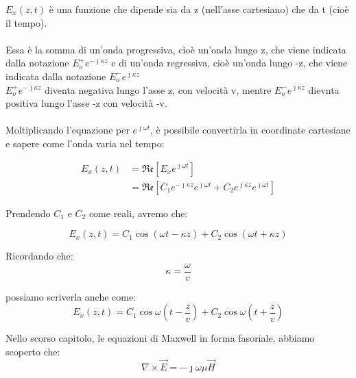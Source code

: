 $E_x (z,t)$ è una funzione che dipende sia da z (nell'asse cartesiano) che da t (cioè il tempo).  \\ \\

Essa è la somma di un'onda progressiva, cioè un'onda lungo z, che viene indicata dalla notazione $E_o ^+ e^{-\jmath \kappa z}$ 
e di un'onda regressiva, cioè un'onda lungo -z, che viene indicata dalla notazione $E_o ^- e^{\jmath \kappa z}$ \\ 

$E_o ^+ e^{-\jmath \kappa z}$ diventa negativa lungo l'asse z, con velocità v, mentre $E_o ^- e^{\jmath \kappa z}$ dievnta positiva 
lungo l'asse -z con velocità -v. \\ \\ 

Moltiplicando l'equazione per $e^{\jmath \omega t}$, è possibile convertirla in coordinate cartesiane e sapere come l'onda varia nel tempo:

{
    \Large
    \begin{equation}
        \begin{split}
            E_x (z,t) 
            &= \mathfrak{Re}[E_x e^{\jmath \omega t}]\\ 
            &= \mathfrak{Re}[C_1 e^{- \jmath \kappa z} e^{\jmath \omega t} +  C_2 e^{ \jmath \kappa z} e^{\jmath \omega t}]            
        \end{split}
    \end{equation}
}


Prendendo $C_1$ e $C_2$ come reali, avremo che: 

{
    \Large
    \begin{equation}
    E_x (z,t) = C_1 \cos(\omega t - \kappa z) + C_2 \cos(\omega t + \kappa z)    
    \end{equation}
}

Ricordando che: 
{
    \Large
    \begin{equation}
        \kappa = \frac{\omega}{v}   
    \end{equation}
}

possiamo scriverla anche come: 
{
    \Large 
    \begin{equation}
    E_x (z,t) = C_1 \cos\omega( t - \frac{z}{v}) + C_2 \cos\omega( t + \frac{z}{v})
    \end{equation}
}

Nello scorso capitolo, le equazioni di Maxwell in forma fasoriale, abbiamo scoperto che:  
{
    \Large
    \begin{equation}
     \nabla \times \vec{E} = -\jmath \omega \mu \vec{H}   
    \end{equation}
}


